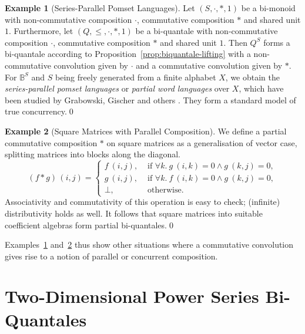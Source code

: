 \documentclass[12pt]{article}
\newcommand{\Al}{X}
\theoremstyle{definition}
\newtheorem{example}{Example}
\begin{document}
 \begin{example}[Series-Parallel Pomset Languages]\label{ex:pomsets}
   Let $(S,\cdot,\ast,1)$ be a bi-monoid with non-commutative
   composition $\cdot$, commutative composition $\ast$ and shared unit
   $1$. Furthermore, let $(Q,\le,\cdot,\ast,1)$ be a bi-quantale with
   non-commutative composition $\cdot$, commutative composition $\ast$
   and shared unit $1$. Then $Q^S$ forms a bi-quantale according to
   Proposition~\ref{prop:biquantale-lifting} with a non-commutative
   convolution given by $\cdot$ and a commutative convolution given by
   $\ast$. For $\mathbb{B}^S$ and $S$ being freely generated from a
   finite alphabet $\Al$, we obtain the \emph{series-parallel pomset
     languages} or \emph{partial word languages} over $\Al$, which
   have been studied by Grabowski, Gischer and others
   \cite{Grabowski,Gischer}. They form a standard model of true
   concurrency.\qed
 \end{example}

 \begin{example}[Square Matrices with Parallel Composition]\label{ex:matrix-par}
   We define a partial commutative composition $\ast$ on square
   matrices as a generalisation of vector case, splitting matrices
   into blocks along the diagonal.
   \begin{equation*}
     (f\ast g)\, (i,j)=
     \begin{cases}
       f\ (i,j),& \text{ if } \forall k.\ g\ (i,k) = 0\wedge  g\ (k,j)= 0,\\
       g\ (i,j),& \text{ if } \forall k.\ f\ (i,k)=0\wedge g\ (k,j)=0,\\
       \bot, & \text{ otherwise}.
     \end{cases}
   \end{equation*}
   Associativity and commutativity of this operation is easy to check;
   (infinite) distributivity holds as well. It follows that square
   matrices into suitable coefficient algebras form partial
   bi-quantales.\qed
 \end{example}
 Examples~\ref{ex:pomsets} and~\ref{ex:matrix-par} thus show other
 situations where a commutative convolution gives rise to a notion of
 parallel or concurrent composition.




\section{Two-Dimensional Power Series
  Bi-Quantales}\label{sec:fpsbiquantale}
\end{document}
